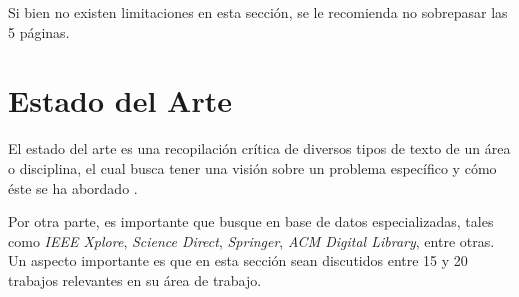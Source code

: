 Si bien no existen limitaciones en esta sección, se le recomienda no sobrepasar las 5 páginas.



\section{Estado del Arte}
\label{sc:EA}

El estado del arte es una recopilación crítica de diversos tipos de texto de un área o disciplina, el cual busca tener una visión sobre un problema específico y cómo éste se ha abordado \cite{londono2014guias}.

Por otra parte, es importante que busque en base de datos especializadas, tales como \textit{IEEE Xplore}, \textit{Science Direct}, \textit{Springer}, \textit{ACM Digital Library}, entre otras. Un aspecto importante es que en esta sección sean discutidos entre 15 y 20 trabajos relevantes en su área de trabajo.
